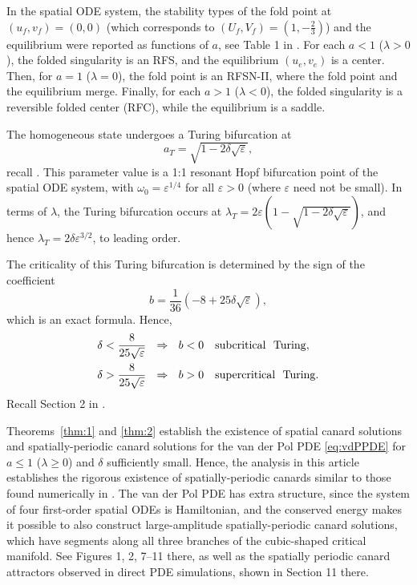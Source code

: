 \documentclass[11pt]{article}
\def\eps{\varepsilon}
\numberwithin{equation}{section}
\begin{document}
In the spatial ODE system, the stability types of the fold point at $(u_f,v_f)=(0,0)$ (which corresponds to $(U_f,V_f)=\left(1,-\frac{2}{3}\right)$) and the equilibrium were reported as functions of $a$, see Table 1 in \cite{VDK2025}.
For each $a<1$ ($\lambda>0$), the folded singularity is an RFS, and the equilibrium $(u_e,v_e)$ is a center.
Then, for $a=1$ ($\lambda=0$), the fold point is an RFSN-II, where the fold point and the equilibrium merge. 
Finally, for each $a>1$ ($\lambda<0$), the folded singularity is a reversible folded center (RFC), while the equilibrium is a saddle.

The homogeneous state undergoes a Turing bifurcation at 
\begin{equation}\label{eq:vdP-aT}
a_T= \sqrt{ 1 - 2\delta \sqrt{\varepsilon}},
\end{equation}
recall \cite{VDK2025}.
This parameter value is a 1:1 resonant Hopf bifurcation point of the spatial ODE system, with $\omega_0=\eps^{1/4}$ for all $\eps>0$ (where $\eps$ need not be small).
In terms of $\lambda$, the Turing bifurcation occurs at
$\lambda_T= 2\eps \left(1 - \sqrt{1-2\delta\sqrt{\eps}}\right)$, and hence
$\lambda_T = 2 \delta \eps^{3/2}$, to leading order.


The criticality of this Turing bifurcation is determined by the sign of the coefficient
\begin{equation}
    b=\frac{1}{36}\left(-8 + 25\delta \sqrt{\eps}\right),
\end{equation}
which is an exact formula.
Hence, 
\begin{equation}
    \begin{split}
        \delta &< \frac{8}{25\sqrt{\eps}} \ \ \Rightarrow \ \  b<0 \ \ \ 
        {\rm subcritical} \ \ {\rm Turing}, \\
        \delta &> \frac{8}{25\sqrt{\eps}} \ \ \Rightarrow \ \ b>0 \ \ \ {\rm supercritical} \ \ {\rm Turing}.
    \end{split}
\end{equation}
Recall Section 2 in \cite{VDK2025}.


Theorems~\ref{thm:1} and \ref{thm:2} establish the existence of spatial canard solutions and spatially-periodic canard solutions for the van der Pol PDE \eqref{eq:vdPPDE} for $a \le 1$ ($\lambda\ge 0$) and $\delta$ sufficiently small. 
Hence, the analysis in this article establishes the rigorous existence of spatially-periodic
canards similar to those found numerically in \cite{VDK2025}.
The van der Pol PDE has extra structure, since the system of four first-order spatial ODEs is Hamiltonian, and the conserved energy makes it possible to also construct large-amplitude spatially-periodic canard solutions, which have segments along all three branches of the cubic-shaped critical manifold. 
See Figures 1, 2, 7--11 there, as well as the spatially periodic canard attractors observed in direct PDE simulations, shown in Section 11 there.
\end{document}

